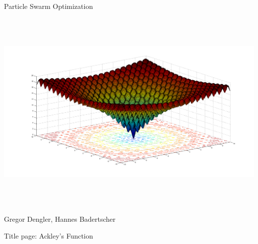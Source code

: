
\begin{titlepage}
	\vspace{2cm}
	\begin{center}
	{	\huge
		Particle Swarm Optimization
	}
	\end{center}
	
		
	\vspace{4cm}
	\includegraphics[height=10cm]{images/title.png}
	\vspace{4cm}
	
	\begin{center}
		\large
		Gregor Dengler, Hannes Badertscher \\
		\vspace{5mm}
		\Date
	\end{center}
	
	\thispagestyle{empty} %
\end{titlepage}

\tableofcontents

\vspace{10mm}
{ \tiny
Title page: Ackley's Function
}
\newpage
